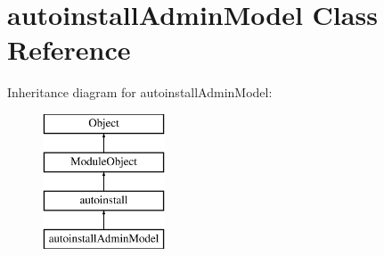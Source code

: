\hypertarget{classautoinstallAdminModel}{}\section{autoinstall\+Admin\+Model Class Reference}
\label{classautoinstallAdminModel}
Inheritance diagram for autoinstall\+Admin\+Model\+:\begin{figure}[H]
\begin{center}
\leavevmode
\includegraphics[height=4.000000cm]{classautoinstallAdminModel}
\end{center}
\end{figure}
